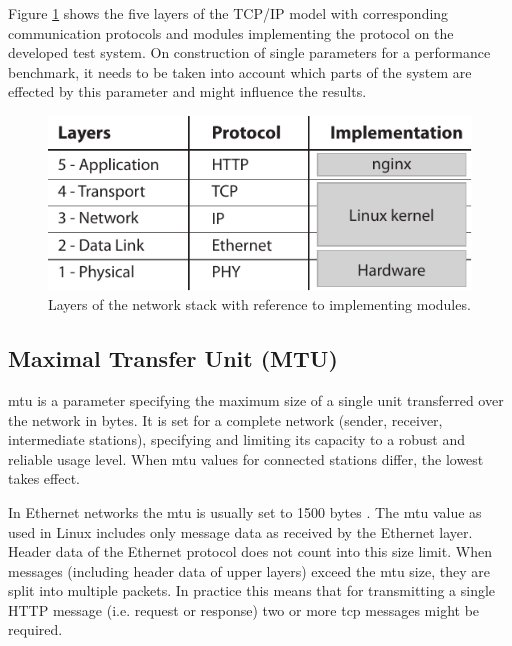 Figure \ref{fig:net-layers} shows the five layers of the TCP/IP model with corresponding communication protocols and modules implementing the protocol on the developed test system. On construction of single parameters for a performance benchmark, it needs to be taken into account which parts of the system are effected by this parameter and might influence the results.

\begin{figure}[H]
	\centering
	\includegraphics[scale=1]{images/network-layers.pdf}
	\caption{Layers of the network stack with reference to implementing modules.}
	\label{fig:net-layers}
\end{figure}

\subsection{Maximal Transfer Unit (MTU)}
\label{subsec:mtu}

\gls{mtu} is a parameter specifying the maximum size of a single unit transferred over the network in bytes. It is set for a complete network (sender, receiver, intermediate stations), specifying and limiting its capacity to a robust and reliable usage level. When \gls{mtu} values for connected stations differ, the lowest takes effect. 

In Ethernet networks the \gls{mtu} is usually set to 1500 bytes \cite{kn1}. The \gls{mtu} value as used in Linux includes only message data as received by the Ethernet layer. Header data of the Ethernet protocol does not count into this size limit. When messages (including header data of upper layers) exceed the \gls{mtu} size, they are split into multiple packets. In practice this means that for transmitting a single HTTP message (i.e. request or response) two or more \gls{tcp} messages might be required.
\\

